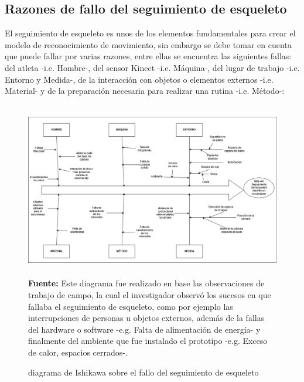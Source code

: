 \begin{landscape}
\section{Razones de fallo del seguimiento de esqueleto}
El seguimiento de esqueleto es unos de los  elementos fundamentales para crear el modelo de reconocimiento de movimiento, sin embargo se debe tomar en cuenta que puede fallar por varias razones, entre ellas se encuentra las siguientes fallas: del atleta -i.e. Hombre-, del sensor Kinect -i.e. M\'aquina-, del lugar de trabajo -i.e. Entorno y  Medida-, de la interacci\'on  con objetos o elementos externos -i.e. Material- y de la preparaci\'on necesaria para realizar una rutina -i.e. M\'etodo-:
\begin{figure}[H]
	\caption{diagrama de Ishikawa sobre el fallo del seguimiento de esqueleto}
	\label{fig:ishikawa}
	\centering
	\includegraphics[width=500px,height=290px]{graphics/resultados/Ishi-SeguimientoDeEsqueleto.PNG} \\
	\textbf{Fuente:} Este diagrama fue realizado en base las observaciones de trabajo de campo, la cual el investigador observ\'o los sucesos en que fallaba el seguimiento de esqueleto, como por ejemplo las interrupciones de personas u objetos externos, adem\'as de la fallas del hardware o software -e.g. Falta de alimentaci\'on de energ\'ia- y finalmente del ambiente que fue instalado el prototipo -e.g. Exceso de calor, espacios cerrados-.
\end{figure}
\end{landscape}
